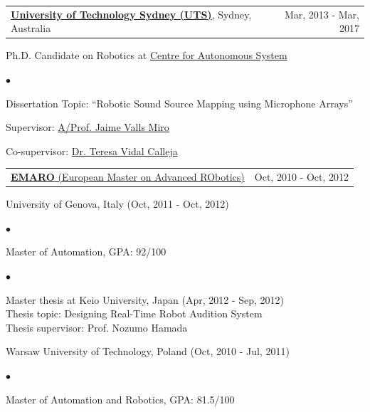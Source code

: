 \documentclass[margin,line]{res}
\newenvironment{list1}{
  \begin{list}{\ding{113}}{%
      \setlength{\itemsep}{0in}
      \setlength{\parsep}{0in} \setlength{\parskip}{0in}
      \setlength{\topsep}{0in} \setlength{\partopsep}{0in} 
      \setlength{\leftmargin}{0.17in}}}{\end{list}}
\newenvironment{list2}{
  \begin{list}{$\bullet$}{%
      \setlength{\itemsep}{0in}
      \setlength{\parsep}{0in} \setlength{\parskip}{0in}
      \setlength{\topsep}{0in} \setlength{\partopsep}{0in} 
      \setlength{\leftmargin}{0.2in}}}{\end{list}}
\begin{document}
\begin{resume}
\begin{tabularx}{\textwidth}{X r}
\href{http://www.uts.edu.au}{{\bf University of Technology Sydney (UTS)}}, Sydney, Australia  &Mar, 2013 - Mar, 2017\\
\end{tabularx}
\vspace*{-.1in}
\begin{list1}
\item[] Ph.D. Candidate on Robotics at \href{http://www.cas.uts.edu.au}{Centre for Autonomous System}%
\begin{list2}
\vspace*{.05in}
\item Dissertation Topic:  ``Robotic Sound Source Mapping using Microphone Arrays'' 
\item Supervisor: \href{http://www.uts.edu.au/staff/jaime.vallsmiro}{A/Prof. Jaime Valls Miro}
\item Co-supervisor:  \href{http://www.uts.edu.au/staff/teresa.vidalcalleja}{Dr. Teresa Vidal Calleja}
\end{list2}
\end{list1}

\begin{tabularx}{\textwidth}{X r}
\href{http://emaro.irccyn.ec-nantes.fr/}{{\bf EMARO} (European Master on Advanced RObotics)} &Oct, 2010 - Oct, 2012\\
\end{tabularx}
\vspace*{-.1in}
\begin{list1}
\item[] University of Genova, Italy (Oct, 2011 - Oct, 2012)
\begin{list2}
\vspace*{.05in}
\item Master of Automation, GPA: 92/100
\end{list2}
\begin{list2}
\vspace*{.05in}
\item Master thesis at Keio University, Japan (Apr, 2012 - Sep, 2012)\\
Thesis topic: Designing Real-Time Robot Audition System\\
Thesis supervisor: Prof. Nozumo Hamada
\end{list2}
\end{list1}
\begin{list1}
\item[] Warsaw University of Technology, Poland (Oct, 2010 - Jul, 2011)
\begin{list2}
\vspace*{.05in}
\item Master of Automation and Robotics, GPA: 81.5/100
\end{list2}
\end{list1}


\end{resume}
\end{document}
